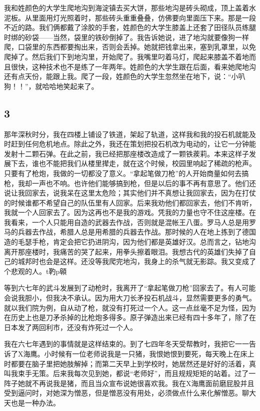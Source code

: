 我和姓颜色的大学生爬地沟到海淀镇去买大饼，那些地沟是砖头砌成，顶上盖着水泥板。从里面用灯光照着时，那些砖头重重叠叠，仿佛要向里面压下来。那是一段不近的路。我们俩都戴了涂胶的手套，姓颜色的大学生膝盖上还套了田径队员练腿时绑的砂袋——当然，袋里的铁砂倒掉了。我告诉她说，进了地沟就要像狗一样爬，口袋里的东西都要掏出来，否则会丢掉。她就把钱拿出来，塞到乳罩里，以免爬掉了。然后我们下到地沟里，开始爬了。我嘴里叼着马灯，爬起来膝盖不着地而且很快，这种技术也不是练了一年两年。姓颜色的大学生跟在后面，看来她爬地沟还有点天份，能跟上我。爬了一段，姓颜色的大学生忽然坐在地下，说：“小叭狗！！”，就哈哈地笑起来了。 

\subsection{3} 

那年深秋时分，我在四楼上铺设了铁道，架起了轨道，这样我和我的投石机就能及时赶到任何危机地点。除此之外，我还在策划把投石机改为电动的，让它一分钟能发射十二颗石弹。在此之前，我已经把那座楼改造成了一颗铁蒺莉。本来这样子发展下去，谁也不能把我们从楼里撵走，就在这个时候，校园里响起了稀疏的枪声。只要有了枪炮，我做的一切都没了意义。“拿起笔做刀枪”的人开始商量如何去搞枪，我却一声也不响。也许他们能够搞到枪，但是以后的事不再有意思了。他们还说让我回家去，说我呆在这里太危险；其实他们并不真想让我回家去，因为在打仗的时候谁都不希望自己的队伍里有人回家。后来我劝他们都回家去，他们不肯听，我就一个人回家去了。因为这再也不是我的游戏。凭我的力量也守不住这座楼。在我看来，一个人只能用自造的武器去作战，否则就是混帐王八蛋。罗马人总是用罗马的兵器去作战，希腊人总是用希腊的兵器去作战。那时候的人在地上拣到了德国造的毛瑟手枪，肯定会把它扔进阴沟，因为他们都是英雄好汉。总而言之，钻地沟离开那座楼时，我痛苦的哭了起来，用拳头擦着眼泪。我想古代的英雄们失掉了自己的城邦时也会是这样。还没等我爬完地沟，我身上的杀气就无影踪。我又变成了个悲观的人。t靮p顊 

等到六七年的武斗发展到了动枪时，我离开了“拿起笔做刀枪”回家去了。有人可能会说我胆小，但我决不承认。因为用大刀长矛投石机战斗，显然需要更多的勇气。就以我们院为例，自从动了枪，就没有打死过一个人。这一点丝毫不足为怪，因为在历史上也是刀矛杀掉的比枪炮多得多。原子弹造出来已经有四十多年了，除了在日本发了两回利市，还没有炸死过一个人。 

我在六七年遇到的事情就是这样结束的。到了七四年冬天受帮教时，我把它一一告诉了X海鹰。小时候有一位老师说我是一只猪，我恨她恨到要死，每天晚上在床上时都要在脑子里把她肢解掉；而第二天早上到学校时，她居然还是好好的活着，真叫我束手无策。后来我每次见到她，都说“老师好”，而且规规矩矩的站着。过了一阵子她就不再说我是猪，而且当众宣布说她很喜欢我。我在X海鹰面前磨屁股并且受到逼问时，对她深为憎恶，但是憎恶没有用处，必须做点什么来化解憎恶。聊大天也是一种办法。 

